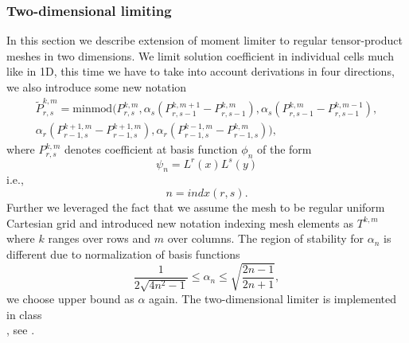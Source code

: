 \subsubsection{Two-dimensional limiting}
In this section we describe extension of moment limiter to regular 
tensor-product meshes in two dimensions. We limit solution coefficient in 
individual cells much like in 1D, this time we have to take into account 
derivations in four directions, we also introduce some new notation
\begin{multline}
\tilde{P}^{k,m}_{r,s} =
\text{minmod}\big(P^{k,m}_{r,s}, 
\alpha_s(P^{k,m+1}_{r,s-1} - P^{k,m}_{r,s-1}),
\alpha_s(P^{k,m}_{r,s-1} - P^{k,m-1}_{r,s-1}),\\
\alpha_r(P^{k+1,m}_{r-1,s} - P^{k+1,m}_{r-1,s}),
\alpha_r(P^{k-1,m}_{r-1,s} - P^{k,m}_{r-1,s})\big),
\end{multline}
where $P^{k, m}_{r,s}$ denotes coefficient at basis function $\phi_n$ of the form
$$
\psi_n = L^r(x)L^s(y)
$$
i.e.,
$$
n = indx(r, s).
$$
Further we leveraged the fact that we assume the mesh to be regular uniform 
Cartesian grid and introduced new notation indexing mesh elements as $T^{k,m}$ where $k$ 
ranges over rows and $m$ over columns. The region of stability for $\alpha_n$ is 
different due to normalization of basis functions
\begin{equation}
\frac{1}{2\sqrt{4n^2 - 1}} \leq \alpha_n \leq \sqrt{\frac{2n - 1}{2n + 1}},
\end{equation}
we choose upper bound as $\alpha$ again. The two-dimensional limiter is implemented in 
class\\ , see . 



